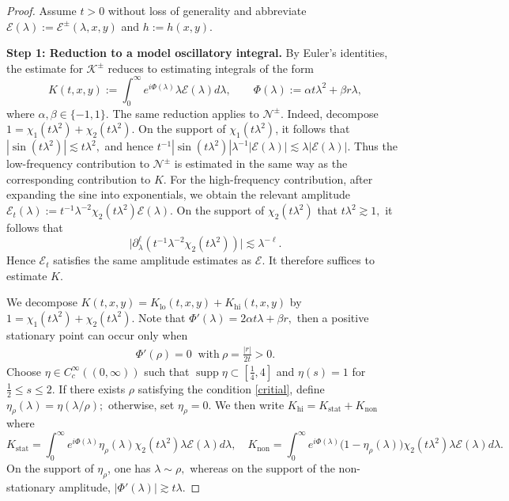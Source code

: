 \documentclass[reqno]{amsart}
\numberwithin{equation}{section}
\begin{document}
\begin{proof}
Assume $t > 0$ without loss of generality and abbreviate $\mathcal{E}(\lambda) := \mathcal{E}^\pm(\lambda, x,y)$ and $h := h(x,y)$. 
	\medskip
	
	\textbf{Step 1: Reduction to a model oscillatory integral.}
	By Euler's identities, the estimate for $\mathcal K^\pm$ reduces to
	estimating integrals of the form
	$$
	K(t,x,y)
	:=
	\int_0^\infty
	e^{i\Phi(\lambda)}
	\lambda\mathcal E(\lambda)d\lambda,
	\qquad
	\Phi(\lambda)
	:=
	\alpha t\lambda^2+\beta r\lambda,
	$$
	where $\alpha,\beta\in\{-1,1\}$.
	The same reduction applies to $\mathcal N^\pm$. Indeed, decompose
	$
	1
	=
	\chi_1(t\lambda^2)
	+
	\chi_2(t\lambda^2).
	$
	On the support of $\chi_1(t\lambda^2)$, it follows that
	$ 
	|\sin(t\lambda^2)|
	\lesssim
	t\lambda^2,
	$
	and hence
	$
	t^{-1}
	|\sin(t\lambda^2)|
	\lambda^{-1}
	|\mathcal E(\lambda)|
	\lesssim
	\lambda|\mathcal E(\lambda)|.
	$
	Thus the low-frequency contribution to $\mathcal N^\pm$ is estimated
	in the same way as the corresponding contribution to $K$.
	For the high-frequency contribution, after expanding the sine into
	exponentials, we obtain the relevant amplitude
	$
	\mathcal E_t(\lambda)
	:=
	t^{-1}\lambda^{-2}
	\chi_2(t\lambda^2)
	\mathcal E(\lambda).
	$
		On the support of $\chi_2(t\lambda^2)$ that
$	t\lambda^2\gtrsim1,
	$
it follows that
	$$
	\big|
	\partial_\lambda^\ell
	\left(
	t^{-1}\lambda^{-2}\chi_2(t\lambda^2)
	\right)
	\big|
	\lesssim
	\lambda^{-\ell}.
	$$
	Hence $\mathcal E_t$ satisfies the same
	amplitude estimates as $\mathcal E$.
	It therefore suffices to estimate
	$K$.
	
	
	We decompose
	$
	K(t,x,y)
	=
	K_{\mathrm{lo}}(t,x,y)
	+
	K_{\mathrm{hi}}(t,x,y)
	$
by
	$
	1
	=
	\chi_1(t\lambda^2)
	+
	\chi_2(t\lambda^2).
	$
Note that	$
	\Phi'(\lambda)
	=
	2\alpha t\lambda+\beta r,
$
then	a positive stationary point can occur only
 when \begin{align}\label{critial}
 \Phi'(\rho)
 =0
 \  \text{ with}
	\ 
	\rho
	=
	\frac{|r|}{2t}>0.
	\end{align}
	Choose $\eta\in C_c^\infty((0,\infty))$ such that $	\operatorname{supp}\eta
	\subset
	[\frac14,4]$ and
	$
	\eta(s)=1$ for
	$\frac12\leq s\leq2.
	$
	If there exists $\rho$ satisfying the condition \eqref{critial}, define
	$
	\eta_\rho(\lambda)
	=
	\eta\left({\lambda}/{\rho}\right);
	$
	otherwise, set $\eta_\rho=0$.
	 We then write
	$
	K_{\mathrm{hi}}
	=
	K_{\mathrm{stat}}
	+
	K_{\mathrm{non}}
	$
	where
	$$
	K_{\mathrm{stat}}
	=
	\int_0^\infty
	e^{i\Phi(\lambda)}
	\eta_\rho(\lambda)
	\chi_2(t\lambda^2)
	\lambda\mathcal E(\lambda)d\lambda
	,\quad 
	K_{\mathrm{non}}
	=
	\int_0^\infty
	e^{i\Phi(\lambda)}
	\bigl(1-\eta_\rho(\lambda)\bigr)
	\chi_2(t\lambda^2)
	\lambda\mathcal E(\lambda)d\lambda.
	$$
	On the support of $\eta_\rho$, one has
	$
	\lambda\sim\rho,
	$
	whereas on the support of the non-stationary amplitude, 
	$
	|\Phi'(\lambda)|
	\gtrsim
	t\lambda.
	$
	

\end{proof}
\end{document}
